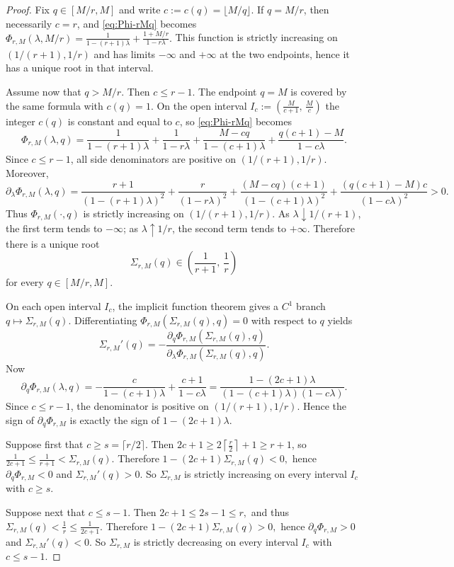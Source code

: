 \documentclass[11pt]{article}
\theoremstyle{remark}
\begin{document}
\begin{proof}
Fix $q\in [M/r,M]$ and write $c:=c(q)=\lfloor M/q\rfloor$.
If $q=M/r$, then necessarily $c=r$, and \eqref{eq:Phi-rMq} becomes
$\Phi_{r,M}(\lambda,M/r) = \frac{1}{1-(r+1)\lambda} + \frac{1+M/r}{1-r\lambda}.$
This function is strictly increasing on $(1/(r+1),1/r)$ and has limits $-\infty$ and $+\infty$
at the two endpoints, hence it has a unique root in that interval.

Assume now that $q>M/r$.
Then $c\le r-1$. The endpoint $q=M$ is covered by the same formula with $c(q)=1$.
On the open interval
$I_c:=\left(\frac{M}{c+1},\,\frac{M}{c}\right)$
the integer $c(q)$ is constant and equal to $c$, so \eqref{eq:Phi-rMq} becomes
$$
\Phi_{r,M}(\lambda,q)
=
\frac{1}{1-(r+1)\lambda}
+
\frac{1}{1-r\lambda}
+
\frac{M-cq}{1-(c+1)\lambda}
+
\frac{q(c+1)-M}{1-c\lambda}.
$$
Since $c\le r-1$, all side denominators are positive on $(1/(r+1),1/r)$.
Moreover,
$$
\partial_\lambda \Phi_{r,M}(\lambda,q)
=
\frac{r+1}{(1-(r+1)\lambda)^2}
+
\frac{r}{(1-r\lambda)^2}
+
\frac{(M-cq)(c+1)}{(1-(c+1)\lambda)^2}
+
\frac{(q(c+1)-M)c}{(1-c\lambda)^2}
>0.
$$
Thus $\Phi_{r,M}(\cdot,q)$ is strictly increasing on $(1/(r+1),1/r)$.
As $\lambda\downarrow 1/(r+1)$, the first term tends to $-\infty$; as
$\lambda\uparrow 1/r$, the second term tends to $+\infty$.
Therefore there is a unique root
$$
\Sigma_{r,M}(q)\in \left(\frac{1}{r+1},\,\frac{1}{r}\right)
$$
for every $q\in [M/r,M]$.

On each open interval $I_c$, the implicit function theorem gives a $C^1$ branch
$q\mapsto \Sigma_{r,M}(q)$.
Differentiating $\Phi_{r,M}(\Sigma_{r,M}(q),q)=0$ with respect to $q$ yields
$$
\Sigma_{r,M}'(q)
=
-
\frac{\partial_q \Phi_{r,M}(\Sigma_{r,M}(q),q)}
{\partial_\lambda \Phi_{r,M}(\Sigma_{r,M}(q),q)}.
$$
Now
$$
\partial_q \Phi_{r,M}(\lambda,q)
=
-\frac{c}{1-(c+1)\lambda}
+
\frac{c+1}{1-c\lambda}
=
\frac{1-(2c+1)\lambda}{(1-(c+1)\lambda)(1-c\lambda)}.
$$
Since $c\le r-1$, the denominator is positive on $(1/(r+1),1/r)$.
Hence the sign of $\partial_q\Phi_{r,M}$ is exactly the sign of $1-(2c+1)\lambda$.

Suppose first that $c\ge s=\lceil r/2\rceil$.
Then $
2c+1\ge 2\left\lceil \frac{r}{2}\right\rceil+1\ge r+1$,
so
$\frac{1}{2c+1}\le \frac{1}{r+1}<\Sigma_{r,M}(q).$
Therefore
$1-(2c+1)\Sigma_{r,M}(q)<0,$
hence $\partial_q\Phi_{r,M}<0$ and
$\Sigma_{r,M}'(q)>0.$
So $\Sigma_{r,M}$ is strictly increasing on every interval $I_c$ with $c\ge s$.

Suppose next that $c\le s-1$.
Then
$2c+1\le 2s-1\le r,$
and thus
$\Sigma_{r,M}(q)<\frac{1}{r}\le \frac{1}{2c+1}.$
Therefore
$1-(2c+1)\Sigma_{r,M}(q)>0,$
hence $\partial_q\Phi_{r,M}>0$ and
$\Sigma_{r,M}'(q)<0.$
So $\Sigma_{r,M}$ is strictly decreasing on every interval $I_c$ with $c\le s-1$.


\end{proof}
\end{document}
